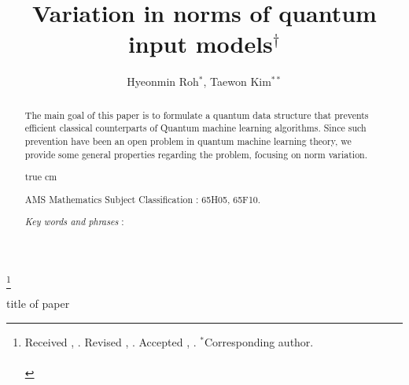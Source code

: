 \documentclass[10pt,twoside,reqno]{amsart} %
\theoremstyle{plain}
\theoremstyle{definition}
\begin{document}
\vspace{-0.15cm}



\vspace{1.3cm}

\title
{ %
Variation in norms of quantum input models$^\dagger$  
}

\author
{ %
  Hyeonmin Roh$^*$, Taewon Kim$^{**}$ 
}

\thanks{ {\scriptsize  Received     ,     .  Revised ,   .    Accepted     ,   . \enskip $^*$Corresponding author.}\\
\\
}


\maketitle


\begin{abstract}
  The main goal of this paper is to formulate a quantum data structure that
  prevents efficient classical counterparts of Quantum machine learning
  algorithms. Since such prevention have been an open problem in quantum 
  machine learning theory, we provide some general properties regarding the
  problem, focusing on norm variation.

 true cm


\noindent
 AMS Mathematics Subject Classification : 65H05, 65F10.

\noindent 
{\it Key words and phrases } : %

\end{abstract}


\pagestyle{myheadings}
         {\centerline {\scriptsize  title of paper  }}
\end{document}
